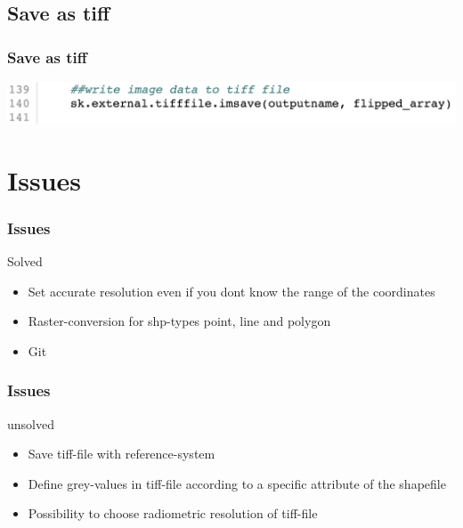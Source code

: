 \documentclass[12pt]{beamer}
\begin{document}
\subsection{Save as tiff}
\begin{frame}\frametitle{Save as tiff}
\includegraphics[scale=0.3]{tiffsave.png}
\end{frame}

\section{Issues}
\begin{frame}\frametitle{Issues}
\begin{block}{Solved}
\begin{itemize}
\item Set accurate resolution even if you dont know the range of the coordinates
\item Raster-conversion for shp-types point, line and polygon
\item Git
\end{itemize}
\end{block}
\end{frame}


\begin{frame}\frametitle{Issues}
\begin{block}{unsolved}
\begin{itemize}
\item Save tiff-file with reference-system
\item Define grey-values in tiff-file according to a specific attribute of the shapefile
\item Possibility to choose radiometric resolution of tiff-file 
\end{itemize}
\end{block}
\end{frame}
\end{document}
